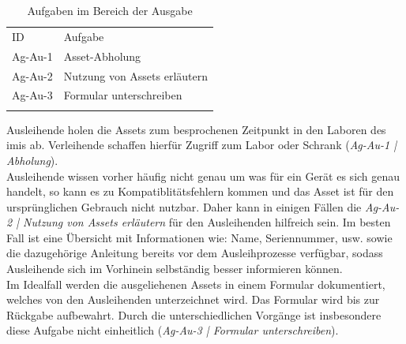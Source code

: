 \begin{table}[h]
        \centering
        \caption{Aufgaben im Bereich der Ausgabe}
        \begin{tabular}{ll}
                \arrayrulecolor{maincolor}\hline
                \sffamily\color{maincolor}ID & \sffamily\color{maincolor}Aufgabe \\
                \arrayrulecolor{maincolor}\hline
                Ag-Au-1                      & Asset-Abholung                    \\
                Ag-Au-2                      & Nutzung von Assets erläutern      \\
                Ag-Au-3                      & Formular unterschreiben           \\
                \arrayrulecolor{maincolor}\hline
        \end{tabular}
        \label{table:Ag-Au}
\end{table}

Ausleihende holen die Assets zum besprochenen Zeitpunkt in den Laboren des \ac{imis} ab. Verleihende
schaffen hierfür Zugriff zum Labor oder Schrank (\textit{Ag-Au-1 | Abholung}). \\
Ausleihende wissen vorher häufig nicht genau um was für ein Gerät es sich genau handelt, so kann es
zu Kompatiblitätsfehlern kommen und das Asset ist für den ursprünglichen Gebrauch nicht nutzbar.
Daher kann in einigen Fällen die \textit{Ag-Au-2 | Nutzung von Assets erläutern} für den
Ausleihenden hilfreich sein. Im besten Fall ist eine Übersicht mit Informationen wie: Name,
Seriennummer, usw. sowie die dazugehörige Anleitung bereits vor dem Ausleihprozesse verfügbar,
sodass Ausleihende sich im Vorhinein selbständig besser informieren können.\\
Im Idealfall werden die ausgeliehenen Assets in einem Formular dokumentiert, welches von den
Ausleihenden unterzeichnet wird. Das Formular wird bis zur Rückgabe aufbewahrt. Durch die
unterschiedlichen Vorgänge ist insbesondere diese Aufgabe nicht einheitlich (\textit{Ag-Au-3 |
        Formular unterschreiben}).

